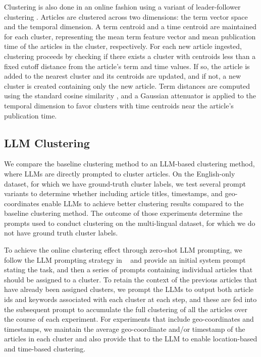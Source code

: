 Clustering is also done in an online fashion using a variant of leader-follower clustering \cite{Duda73}. 
Articles are clustered across two dimensions: the term vector space and the temporal dimension. 
A term centroid and a time centroid are maintained for each cluster, representing the mean term feature vector and mean publication time of the articles in the cluster, respectively. 
For each new article ingested, clustering proceeds by checking if there exists a cluster with centroids less than a fixed cutoff distance from the article's term and time values. 
If so, the article is added to the nearest cluster and its centroids are updated, and if not, a new cluster is created containing only the new article. 
Term distances are computed using the standard cosine similarity \cite{steinbach}, and a Gaussian attenuator is applied to the temporal dimension to favor clusters with time centroids near the article's publication time.



\subsection{LLM Clustering}

We compare the baseline clustering method to an LLM-based clustering method, where LLMs are directly prompted to cluster articles.
On the English-only dataset, for which we have ground-truth cluster labels, we test several prompt variants to determine whether including article titles, timestamps, and geo-coordinates enable LLMs to achieve better clustering results compared to the baseline clustering method.
The outcome of those experiments determine the prompts used to conduct clustering on the multi-lingual dataset, for which we do not have ground truth cluster labels.

To achieve the online clustering effect through zero-shot LLM prompting, we follow the LLM prompting strategy in \citeauthor{Schneider2024c}~\cite{Schneider2024c} and provide an initial system prompt stating the task, and then a series of prompts containing individual articles that should be assigned to a cluster.
To retain the context of the previous articles that have already been assigned clusters, we prompt the LLMs to output both article ids and keywords associated with each cluster at each step, and these are fed into the subsequent prompt to accumulate the full clustering of all the articles over the course of each experiment.
For experiments that include geo-coordinates and timestamps, we maintain the average geo-coordinate and/or timestamp of the articles in each cluster and also provide that to the LLM to enable location-based and time-based clustering.

